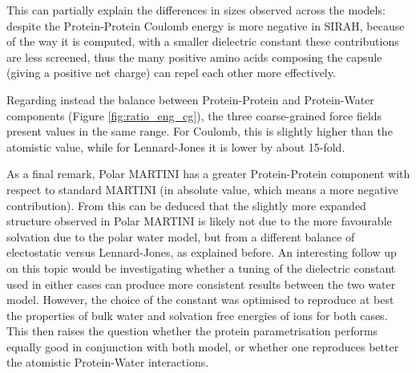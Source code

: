 This can partially explain the differences in sizes observed across the models: despite the Protein-Protein Coulomb energy is more negative in SIRAH, because of the way it is computed, with a smaller dielectric constant these contributions are less screened, thus the many positive amino acids composing the capsule (giving a positive net charge) can repel each other more effectively.

Regarding instead the balance between Protein-Protein and Protein-Water components (Figure \ref{fig:ratio_eng_cg}), the three coarse-grained force fields present values in the same range.
%
For Coulomb, this is slightly higher than the atomistic value, while for Lennard-Jones it is lower by about 15-fold.

As a final remark, Polar MARTINI has a greater Protein-Protein component with respect to standard MARTINI (in absolute value, which means a more negative contribution). From this can be deduced that the slightly more expanded structure observed in Polar MARTINI is likely not due to the more favourable solvation due to the polar water model, but from a different balance of electostatic versus Lennard-Jones, as explained before.
%
An interesting follow up on this topic would be investigating whether a tuning of the dielectric constant used in either cases can produce more consistent results between the two water model. However, the choice of the constant was optimised to reproduce at best the properties of bulk water and solvation free energies of ions for both cases. This then raises the question whether the protein parametrisation performs equally good in conjunction with both model, or whether one reproduces better the atomistic Protein-Water interactions.


